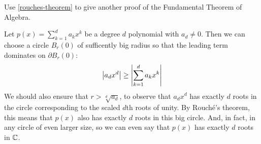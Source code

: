 \documentclass{homework}
\begin{document}
                                                                                                                                                      \begin{problem}
                                                                                                                                                        Use \ref{rouches-theorem} to give another proof of the Fundamental Theorem of Algebra.
                                                                                                                                                        \end{problem}
                                                                                                                                                        \begin{solution}
                                                                                                                                                        Let $p(x) = \sum_{k=1}^d a_kx^k$ be a degree $d$ polynomial with $a_d\neq 0$. Then we can choose a circle $B_r(0)$ of sufficently big radius so that the leading term dominates on $\partial B_r(0)$:
                                                                                                                                                        \[
                                                                                                                                                        \left|a_dx^d\right| \geq \left|\sum_{k=1}^d a_kx^k\right|
                                                                                                                                                        \]
                                                                                                                                                        We should also ensure that $r > \sqrt[d]{a_d}$, to observe that $a_dx^d$ has exactly $d$ roots in the circle corresponding to the scaled $d$th roots of unity. By Rouch\'e's theorem, this means that $p(x)$ also has exactly $d$ roots in this big circle. And, in fact, in any circle of even larger size, so we can even say that $p(x)$ has exactly $d$ roots in $\mathbb{C}$.
                                                                                                                                                        \end{solution}
\end{document}
